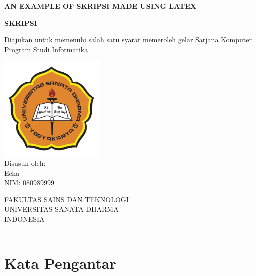 \documentclass[oneside,12pt]{book}
\def\title{An Example of Skripsi Made Using \LaTeX}
\def\author{Echa}
\def\nim{080989999}
\def\prodi{Informatika}
\def\fakultas{Sains dan Teknologi}
\def\sarjana{Komputer}
\begin{document}
\begin{titlepage}
	\begin{center}
		\large
		\textbf{\MakeUppercase{\title}}
		\vspace{2ex}


		\textbf{SKRIPSI}

		\vspace{2ex}

		Diajukan untuk memenuhi salah satu syarat memeroleh gelar Sarjana \sarjana \\Program Studi \prodi


		\vspace{3cm}
		\includegraphics[width=5cm]{usd}\\
		\vspace{1.5cm}
		Disusun oleh:\\
		\author\\
		NIM: \nim\\

		\vspace{2cm}

		\MakeUppercase{
			Fakultas \fakultas\\
			Universitas Sanata Dharma\\
			Indonesia\\
			\the\year{}\\
		}
	\end{center}
\end{titlepage}

\frontmatter




\chapter{Kata Pengantar}
\end{document}
